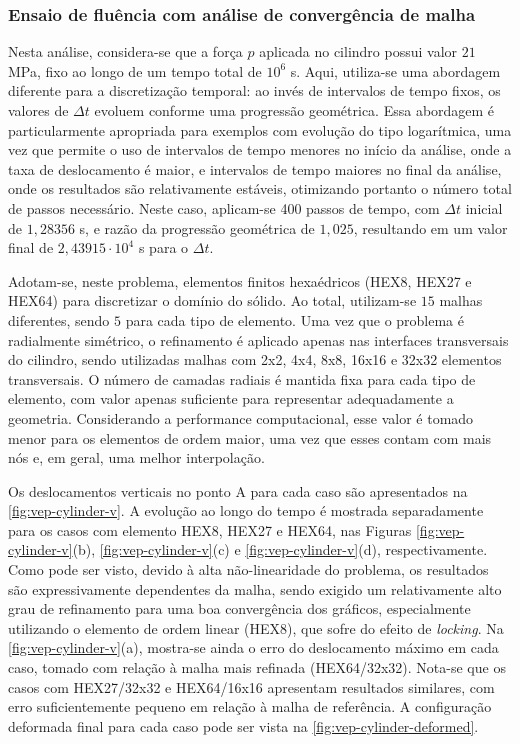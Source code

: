 \documentclass[Tese.tex]{subfiles}
\begin{document}
{\subsubsection{Ensaio de fluência com análise de convergência de malha}

Nesta análise, considera-se que a força $p$ aplicada no cilindro possui valor $21$ MPa, fixo ao longo de um tempo total de $10^6$ s. Aqui, utiliza-se uma abordagem diferente para a discretização temporal: ao invés de intervalos de tempo fixos, os valores de $\Delta t$ evoluem conforme uma progressão geométrica. Essa abordagem é particularmente apropriada para exemplos com evolução do tipo logarítmica, uma vez que permite o uso de intervalos de tempo menores no início da análise, onde a taxa de deslocamento é maior, e intervalos de tempo maiores no final da análise, onde os resultados são relativamente estáveis, otimizando portanto o número total de passos necessário. Neste caso, aplicam-se 400 passos de tempo, com $\Delta t$ inicial de $1,28356$ s, e razão da progressão geométrica de $1,025$, resultando em um valor final de $2,43915\cdot 10^{4}$ s para o $\Delta t$.

Adotam-se, neste problema, elementos finitos hexaédricos (HEX8, HEX27 e HEX64) para discretizar o domínio do sólido. Ao total, utilizam-se $15$ malhas diferentes, sendo $5$ para cada tipo de elemento. Uma vez que o problema é radialmente simétrico, o refinamento é aplicado apenas nas interfaces transversais do cilindro, sendo utilizadas malhas com 2x2, 4x4, 8x8, 16x16 e 32x32 elementos transversais. O número de camadas radiais é mantida fixa para cada tipo de elemento, com valor apenas suficiente para representar adequadamente a geometria. Considerando a performance computacional, esse valor é tomado menor para os elementos de ordem maior, uma vez que esses contam com mais nós e, em geral, uma melhor interpolação.

Os deslocamentos verticais no ponto A para cada caso são apresentados na \autoref{fig:vep-cylinder-v}. A evolução ao longo do tempo é mostrada separadamente para os casos com elemento HEX8, HEX27 e HEX64, nas Figuras \ref{fig:vep-cylinder-v}(b), \ref{fig:vep-cylinder-v}(c) e \ref{fig:vep-cylinder-v}(d), respectivamente. Como pode ser visto, devido à alta não-linearidade do problema, os resultados são expressivamente dependentes da malha, sendo exigido um relativamente alto grau de refinamento para uma boa convergência dos gráficos, especialmente utilizando o elemento de ordem linear (HEX8), que sofre do efeito de \emph{locking}. Na \autoref{fig:vep-cylinder-v}(a), mostra-se ainda o erro do deslocamento máximo em cada caso, tomado com relação à malha mais refinada (HEX64/32x32). Nota-se que os casos com HEX27/32x32 e HEX64/16x16 apresentam resultados similares, com erro suficientemente pequeno em relação à malha de referência. A configuração deformada final para cada caso pode ser vista na \autoref{fig:vep-cylinder-deformed}.

}
\end{document}
